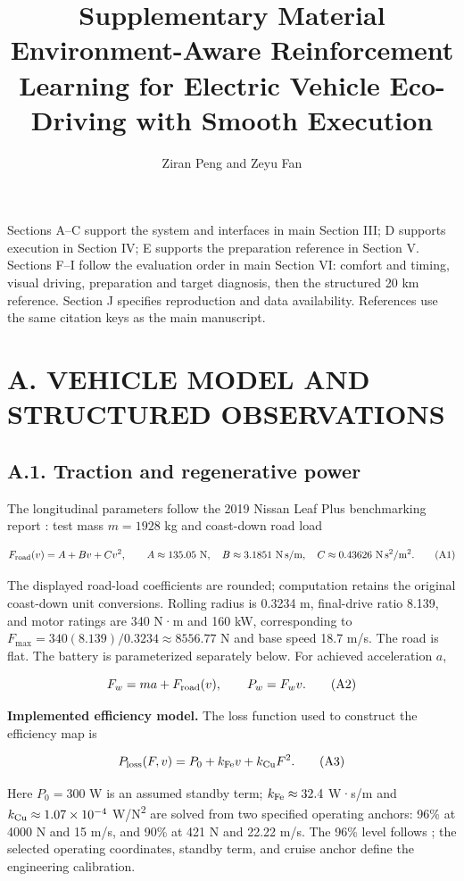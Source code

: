 \documentclass[letterpaper,journal,onecolumn]{IEEEtran}
\begin{document}
\title{Supplementary Material\\Environment-Aware Reinforcement Learning for Electric Vehicle Eco-Driving with Smooth Execution}\author{Ziran Peng and Zeyu Fan}\maketitle
Sections A--C support the system and interfaces in main Section III; D supports execution in Section IV; E supports the preparation reference in Section V. Sections F--I follow the evaluation order in main Section VI: comfort and timing, visual driving, preparation and target diagnosis, then the structured 20 km reference. Section J specifies reproduction and data availability. References use the same citation keys as the main manuscript.

\FloatBarrier{}\section*{A. VEHICLE MODEL AND STRUCTURED OBSERVATIONS}\setcounter{subsection}{0}

\subsection*{A.1. Traction and regenerative power}

The longitudinal parameters follow the 2019 Nissan Leaf Plus benchmarking report \cite{S4}: test mass \(m=1928\) kg and coast-down road load

\[F_{\rm road}(v)=A+Bv+Cv^2,\qquad A\approx135.05\ {\rm N},\quad B\approx3.1851\ {\rm N\,s/m},\quad C\approx0.43626\ {\rm N\,s^2/m^2}. \tag{A1}\]

The displayed road-load coefficients are rounded; computation retains the original coast-down unit conversions. Rolling radius is 0.3234 m, final-drive ratio 8.139, and motor ratings are 340 N·m and 160 kW, corresponding to \(F_{\max}=340(8.139)/0.3234\approx8556.77\) N and base speed 18.7 m/s. The road is flat. The battery is parameterized separately below. For achieved acceleration \(a\),

\[F_w=ma+F_{\rm road}(v),\qquad P_w=F_wv. \tag{A2}\]

\textbf{Implemented efficiency model.} The loss function used to construct the efficiency map is

\[P_{\rm loss}(F,v)=P_0+k_{\rm Fe}v+k_{\rm Cu}F^2. \tag{A3}\]

Here \(P_0=300\) W is an assumed standby term; \(k_{\rm Fe}\approx32.4\) W·s/m and \(k_{\rm Cu}\approx1.07\times10^{-4}\) W/N\textsuperscript{2} are solved from two specified operating anchors: 96\% at 4000 N and 15 m/s, and 90\% at 421 N and 22.22 m/s. The 96\% level follows \cite{S4}; the selected operating coordinates, standby term, and cruise anchor define the engineering calibration.
\end{document}
